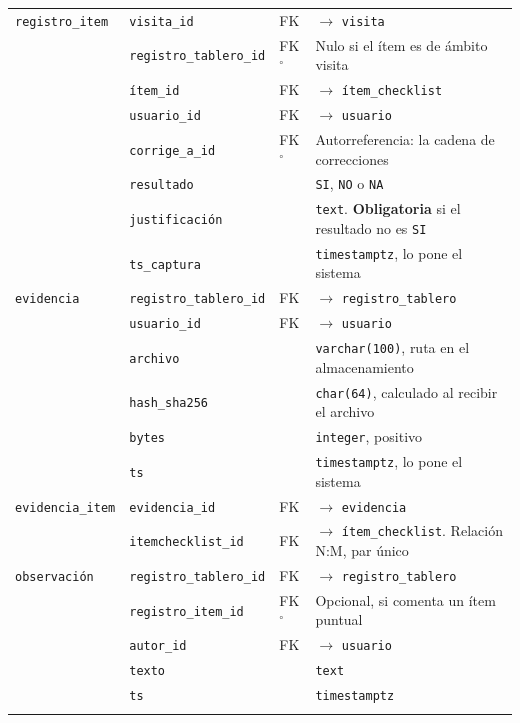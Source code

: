 \documentclass[10pt,letterpaper]{article}
\begin{document}
\begin{longtable}{@{}p{2.9cm}p{3.6cm}p{1.6cm}p{6.6cm}@{}}
\texttt{registro\_item} & \texttt{visita\_id} & FK & $\to$ \texttt{visita} \\
 & \texttt{registro\_tablero\_id} & FK$^\circ$ & Nulo si el ítem es de ámbito visita \\
 & \texttt{ítem\_id} & FK & $\to$ \texttt{ítem\_checklist} \\
 & \texttt{usuario\_id} & FK & $\to$ \texttt{usuario} \\
 & \texttt{corrige\_a\_id} & FK$^\circ$ & Autorreferencia: la cadena de correcciones \\
 & \texttt{resultado} & & \texttt{SI}, \texttt{NO} o \texttt{NA} \\
 & \texttt{justificación} & & \texttt{text}. \textbf{Obligatoria} si el resultado no es \texttt{SI} \\
 & \texttt{ts\_captura} & & \texttt{timestamptz}, lo pone el sistema \\
\addlinespace

\texttt{evidencia} & \texttt{registro\_tablero\_id} & FK & $\to$ \texttt{registro\_tablero} \\
 & \texttt{usuario\_id} & FK & $\to$ \texttt{usuario} \\
 & \texttt{archivo} & & \texttt{varchar(100)}, ruta en el almacenamiento \\
 & \texttt{hash\_sha256} & & \texttt{char(64)}, calculado al recibir el archivo \\
 & \texttt{bytes} & & \texttt{integer}, positivo \\
 & \texttt{ts} & & \texttt{timestamptz}, lo pone el sistema \\
\addlinespace

\texttt{evidencia\_item} & \texttt{evidencia\_id} & FK & $\to$ \texttt{evidencia} \\
 & \texttt{itemchecklist\_id} & FK & $\to$ \texttt{ítem\_checklist}. Relación N:M, par único \\
\addlinespace

\texttt{observación} & \texttt{registro\_tablero\_id} & FK & $\to$ \texttt{registro\_tablero} \\
 & \texttt{registro\_item\_id} & FK$^\circ$ & Opcional, si comenta un ítem puntual \\
 & \texttt{autor\_id} & FK & $\to$ \texttt{usuario} \\
 & \texttt{texto} & & \texttt{text} \\
 & \texttt{ts} & & \texttt{timestamptz} \\
\addlinespace


\end{longtable}
\end{document}
